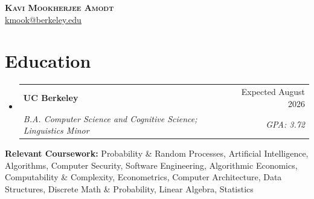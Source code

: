 \documentclass[letterpaper,11pt]{article}
\makeatletter
\newcommand{\resumeSubheading}[4]{
  \vspace{-2pt}\item
    \begin{tabular*}{0.97\textwidth}[t]{l@{\extracolsep{\fill}}r}
      \textbf{#1} & #2 \\
      \textit{\small#3} & \textit{\small #4} \\
    \end{tabular*}\vspace{-7pt}
}
\newcommand{\resumeSubHeadingListStart}{\begin{itemize}[leftmargin=0.15in, label={}]}
\newcommand{\resumeSubHeadingListEnd}{\end{itemize}}
\makeatother
\begin{document}
\begin{center}
    {\Huge \scshape \textbf{Kavi Mookherjee Amodt}} \\ \vspace{1pt}
    \href{mailto:kmook@berkeley.edu}{\underline{kmook@berkeley.edu}}
\end{center}

\section{Education}
  \resumeSubHeadingListStart
    \resumeSubheading
      {UC Berkeley}{Expected August 2026}
      {B.A. Computer Science and Cognitive Science; Linguistics Minor}{GPA: 3.72}
  \resumeSubHeadingListEnd

  \vspace{-8pt}
  \begin{itemize}[leftmargin=0.15in, label={}]
    \small{\item{
      \textbf{Relevant Coursework:} Probability \& Random Processes, Artificial Intelligence, Algorithms, Computer Security, Software Engineering, Algorithmic Economics, Computability \& Complexity, Econometrics, Computer Architecture, Data Structures, Discrete Math \& Probability, Linear Algebra, Statistics
    }}
  \end{itemize}

\end{document}
